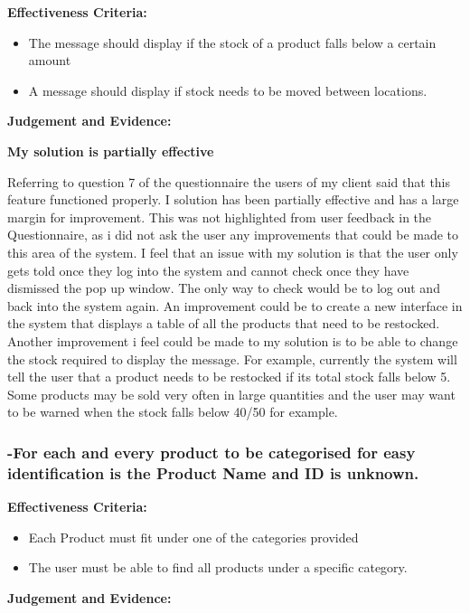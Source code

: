 \textbf{Effectiveness Criteria:}\newline
\begin{itemize}
	\item{The message should display if the stock of a product falls below a certain amount}
	\item{A message should display if stock needs to be moved between locations.}
\end{itemize}

\textbf{Judgement and Evidence:} \newline

\textbf{\large{My solution is partially effective}}

Referring to question 7 of the questionnaire the users of my client said that this feature functioned properly. I solution has been partially effective and has a large margin for improvement. This was not highlighted from user feedback in the Questionnaire, as i did not ask the user any improvements that could be made to this area of the system. I feel that an issue with my solution is that the user only gets told once they log into the system and cannot check once they have dismissed the pop up window. The only way to check would be to log out and back into the system again. An improvement could be to create a new interface in the system that displays a table of all the products that need to be restocked. Another improvement i feel could be made to my solution is to be able to change the stock required to display the message. For example, currently the system will tell the user that a product needs to be restocked if its total stock falls below 5. Some products may be sold very often in large quantities and the user may want to be warned when the stock falls below 40/50 for example.




\pagebreak
\subsubsection{-For each and every product to be categorised for easy identification is the Product Name and ID is unknown.}

\textbf{Effectiveness Criteria:}\newline
\begin{itemize}
	\item{Each Product must fit under one of the categories provided}
	\item{The user must be able to find all products under a specific category.}
\end{itemize}
\textbf{Judgement and Evidence:} \newline

